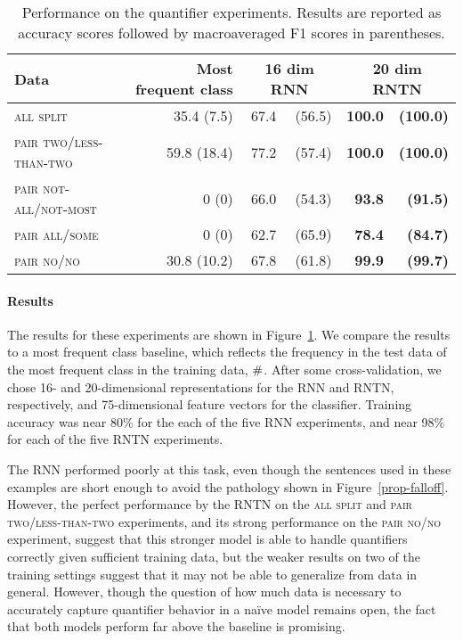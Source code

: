 \begin{table}[tp]
  \centering
  \setlength{\tabcolsep}{10pt}
  \begin{tabular}{ l r r@{ \ }r r@{ \ }r }
    \toprule
    Data & Most frequent class & \multicolumn{2}{c}{16 dim RNN}  & \multicolumn{2}{c}{20 dim RNTN}\\
    \midrule
    \textsc{all split}	            & 35.4 (7.5) &	67.4&(56.5)& \textbf{100.0} & \textbf{(100.0)}
    \\[1ex]    
    \textsc{pair two/less-than-two} & 59.8 (18.4) & 77.2 &(57.4) &	\textbf{100.0} &\textbf{(100.0)} \\
    \textsc{pair not-all/not-most}  &    0 (0)    & 66.0 &(54.3) &	\textbf{93.8}  &\textbf{(91.5)} \\
    \textsc{pair all/some}	    &    0 (0)    & 62.7 &(65.9)  &	\textbf{78.4}  &\textbf{(84.7)} \\
    \textsc{pair no/no}	            & 30.8  (10.2) & 67.8 & (61.8) &	\textbf{99.9}  &\textbf{(99.7)} \\
    \bottomrule
  \end{tabular}
  \caption{Performance on the quantifier experiments. Results are reported as accuracy scores followed by macroaveraged F1 scores in parentheses.}
  \label{resultstable}
\end{table} 


\paragraph{Results} 
The results for these experiments are shown in
Figure~\ref{resultstable}. We compare the results to a most frequent
class baseline, which reflects the frequency in the test data of the
most frequent class in the training data, $\mathbin{\#}$.  After some
cross-validation, we chose 16- and 20-dimensional representations for
the RNN and RNTN, respectively, and 75-dimensional feature vectors for
the classifier. Training
accuracy was near 80\% for the each of the five RNN experiments, and 
near 98\% for each of the five RNTN experiments.


The RNN performed poorly at this task, even though the sentences used
in these examples are short enough to avoid the pathology shown in
Figure~\ref{prop-falloff}.  However, the perfect performance by the
RNTN on the \textsc{all split} and \textsc{pair two/less-than-two}
experiments, and its strong performance on the \textsc{pair no/no}
experiment, suggest that this stronger model is able to handle
quantifiers correctly given sufficient training data, but the weaker
results on two of the training settings suggest that it may not be
able to generalize from data in general. However, though the question
of how much data is necessary to accurately capture quantifier
behavior in a na\"ive model remains open, the fact that both models
perform far above the baseline is promising.

